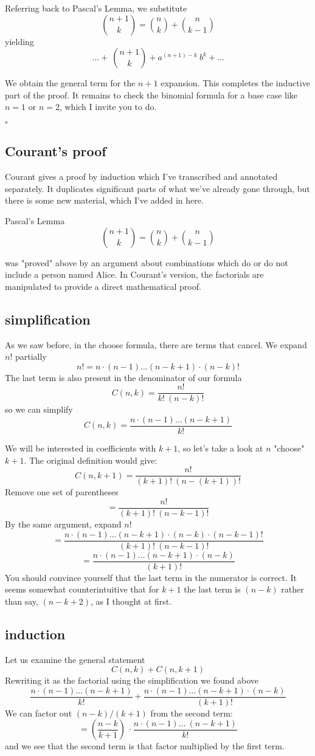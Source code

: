 \documentclass[11pt, oneside]{article}
\begin{document}
Referring back to Pascal's Lemma, we substitute
\[  {{n+1}\choose{k}} = {{n}\choose{k}} + {{n}\choose{k-1}} \]
yielding
\[  \dots +  \ {{n+1}\choose{k}} + a^{(n+1)-k} \ b^{k} + \dots  \]

We obtain the general term for the $n+1$ expansion.  This completes the inductive part of the proof.  It remains to check the binomial formula for a base case like $n=1$ or $n=2$, which I invite you to do.

$\square$

\subsection*{Courant's proof}
Courant gives a proof by induction which I've transcribed and annotated separately.  It duplicates significant parts of what we've already gone through, but there is some new material, which I've added in here.

Pascal's Lemma 
\[  {{n+1}\choose{k}} = {{n}\choose{k}} + {{n}\choose{k-1}} \]

was "proved" above by an argument about combinations which do or do not include a person named Alice.  In Courant's version, the factorials are manipulated to provide a direct mathematical proof.  

\subsection*{simplification}
As we saw before, in the choose formula, there are terms that cancel.  We expand $n!$ partially
\[ n! = n \cdot (n-1) \dots (n-k+1) \cdot (n-k)! \]
The last term is also present in the denominator of our formula
\[ C(n,k) = \frac{n!}{k! \ (n-k)!} \]
so we can simplify 
\[ C(n,k) = \frac{n \cdot (n-1) \dots (n-k+1)}{k!} \]

We will be interested in coefficients with $k+1$, so let's take a look at $n$ "choose" $k+1$.  The original definition would give:
\[ C(n,k+1) = \frac{n!}{(k+1)! \ (n-(k+1))!}  \]
Remove one set of parentheses
\[ = \frac{n!}{(k+1)! \ (n-k-1)!}  \]
By the same argument, expand $n!$
\[ = \frac{n \cdot (n-1) \dots (n-k+1) \cdot (n-k) \cdot (n-k-1)!}{(k+1)! \ (n-k-1)!}  \]
\[ = \frac{n \cdot (n-1) \dots (n-k+1) \cdot (n-k)}{(k+1)!} \]
You should convince yourself that the last term in the numerator is correct.  It seems somewhat counterintuitive that for $k+1$ the last term is $(n-k)$ rather than say, $(n-k+2)$, as I thought at first.

\subsection*{induction}
Let us examine the general statement
\[ C(n,k) + C(n,k+1) \]
Rewriting it as the factorial using the simplification we found above
\[ \frac{n \cdot (n-1) \dots (n-k+1)}{k!} + \frac{n \cdot (n-1) \dots (n-k+1) \cdot (n-k)}{(k+1)!} \]
We can factor out $(n-k)/(k+1)$ from the second term:
\[ = (\frac{n-k}{k+1}) \ \cdot \frac{n \cdot (n-1) \dots \ (n-k+1) }{k!}  \]
and we see that the second term is that factor multiplied by the first term.
\end{document}

